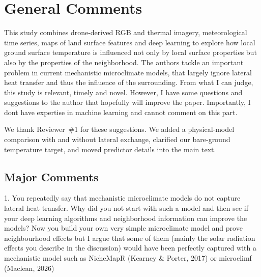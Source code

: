 \documentclass[12pt,english]{reviewresponse}
\begin{document}
\reviewer

\section*{General Comments}

\begin{generalcomment}
This study combines drone-derived RGB and thermal imagery, meteorological time series, maps of land surface features and deep learning to explore how local ground surface temperature is influenced not only by local surface properties but also by the properties of the neighborhood. The authors tackle an important problem in current mechanistic microclimate models, that largely ignore lateral heat transfer and thus the influence of the surrounding. From what I can judge, this study is relevant, timely and novel. However, I have some questions and suggestions to the author that hopefully will improve the paper. Importantly, I dont have expertise in machine learning and cannot comment on this part.
\end{generalcomment}

\begin{revresponse}
We thank Reviewer~\#1 for these suggestions. We added a physical-model comparison with and without lateral exchange, clarified our bare-ground temperature target, and moved predictor details into the main text.
\end{revresponse}

\subsection*{Major Comments}

\begin{revcomment}
1. You repeatedly say that mechanistic microclimate models do not capture lateral heat transfer. Why did you not start with such a model and then see if your deep learning algorithms and neighborhood information can improve the models? Now you build your own very simple microclimate model and prove neighbourhood effects but I argue that some of them (mainly the solar radiation effects you describe in the discussion) would have been perfectly captured with a mechanistic model such as NicheMapR (Kearney \& Porter, 2017) or microclimf (Maclean, 2026)
\end{revcomment}
\end{document}

